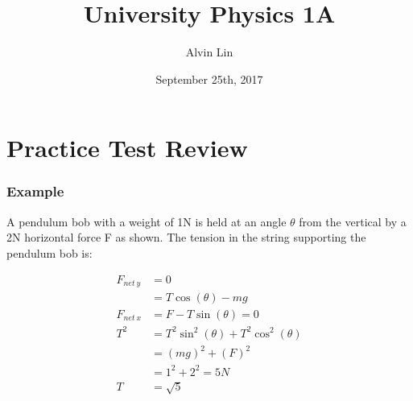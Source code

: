 \documentclass[letterpaper, 12pt]{math}
\title{University Physics 1A}
\author{Alvin Lin}
\date{September 25th, 2017}
\begin{document}
\maketitle

\section*{Practice Test Review}

\subsubsection*{Example}
A pendulum bob with a weight of 1N is held at an angle \( \theta \) from the
vertical by a 2N horizontal force F as shown. The tension in the string
supporting the pendulum bob is:
\begin{center}
\end{center}
\begin{align*}
  F_{net\ y} &= 0 \\
  &= T\cos(\theta)-mg \\
  F_{net\ x} &= F-T\sin(\theta) = 0 \\
  T^2 &= T^2\sin^2(\theta)+T^2\cos^2(\theta) \\
  &= (mg)^2+(F)^2 \\
  &= 1^2+2^2 = 5N \\
  T &= \sqrt{5}
\end{align*}
\end{document}
